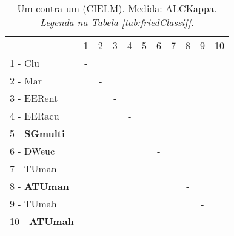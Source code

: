 \begin{table}[h]
\caption{Um contra um (CIELM). Medida: ALCKappa. \textit{Legenda na Tabela \ref{tab:friedClassif}.}}
\begin{center}\begin{tabular}{lcc|cc|cc|cc|cc}
 			& 1 & 2 & 3 & 4 & 5 & 6 & 7 & 8 & 9 & 10\\
1 - Clu  	& - &   &   &   &   &   &   &   &   &   \\
2 - Mar  	&   & - &   &   &   &   &   &   &   &   \\ \hline
3 - EERent	&   &   & - &   &   &   &   &   &   &   \\
4 - EERacu	&   &   &   & - &   &   &   &   &   &   \\ \hline
5 - \textbf{SGmulti}	&   &   &   &   & - &   &   &   &   &   \\
6 - DWeuc	&   &   &   &   &   & - &   &   &   &   \\ \hline
7 - TUman	&   &   &   &   &   &   & - &   &   &   \\
8 - \textbf{ATUman}	&   &   &   &   &   &   &   & - &   &   \\ \hline
9 - TUmah	&   &   &   &   &   &   &   &   & - &   \\
10 - \textbf{ATUmah}	&   &   &   &   &   &   &   &   &   & - \\ \hline\end{tabular}
\label{stratsALCKappaFriedCIELMRiscoRedux}
\end{center}
\end{table}